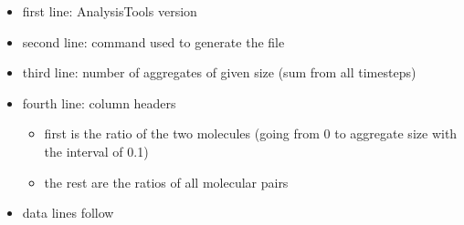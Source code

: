 \begin{enumerate}[nosep,leftmargin=20pt]
  \begin{itemize}[nosep,leftmargin=5pt]
    \item first line: AnalysisTools version
    \item second line: command used to generate the file
    \item third line: number of aggregates of given size (sum from all
      timesteps)
    \item fourth line: column headers
      \begin{itemize}[nosep,leftmargin=10pt]
        \item first is the ratio of the two molecules (going from 0 to aggregate
          size with the interval of 0.1)
        \item the rest are the ratios of all molecular pairs
      \end{itemize}
    \item data lines follow
  \end{itemize}
\end{enumerate}
